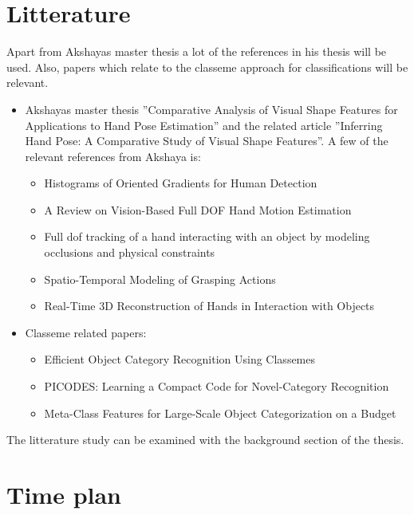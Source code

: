 \documentclass[12pt]{article}
\begin{document}
\section*{Litterature}
Apart from Akshayas master thesis a lot of the references in his thesis will be used. Also, papers which relate to the classeme approach for classifications will be relevant.
\begin{itemize}
\item
Akshayas master thesis ''Comparative Analysis of Visual Shape Features for Applications to Hand Pose Estimation'' and the related article ''Inferring Hand Pose: A Comparative Study of Visual Shape Features''. A few of the relevant references from Akshaya is:
\begin{itemize}
\item
Histograms of Oriented Gradients for Human Detection
\item
A Review on Vision-Based Full DOF Hand Motion Estimation
\item
Full dof tracking of a hand interacting with an object by modeling occlusions and physical constraints
\item
Spatio-Temporal Modeling of Grasping Actions
\item
Real-Time 3D Reconstruction of Hands in Interaction with Objects
\end{itemize}
\item
Classeme related papers:
\begin{itemize}
\item
Efficient Object Category Recognition Using Classemes
\item
PICODES: Learning a Compact Code for Novel-Category Recognition
\item
Meta-Class Features for Large-Scale Object Categorization on a Budget
\end{itemize}
\end{itemize}
The litterature study can be examined with the background section of the thesis.

\section*{Time plan}
\FloatBarrier
\end{document}
